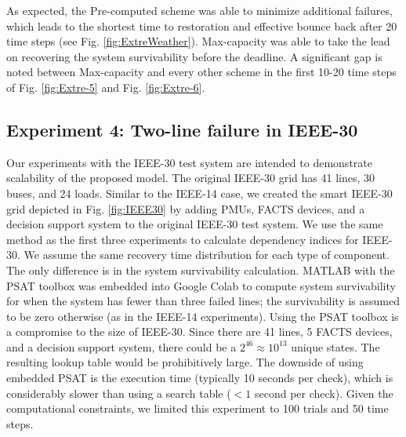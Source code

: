 \documentclass[conference]{IEEEtran}
\begin{document}
As expected, the Pre-computed scheme was able to minimize additional failures, which leads to the shortest time to restoration and effective bounce back after 20 time steps (see Fig.  \ref{fig:ExtreWeather}).  Max-capacity was able to take the lead on recovering the system survivability before the deadline. A significant gap is noted between Max-capacity and every other scheme in the first 10-20 time steps of Fig. \ref{fig:Extre-5} and Fig. \ref{fig:Extre-6}.


\subsection{Experiment 4: Two-line failure in IEEE-30}
Our experiments with the IEEE-30 test system are intended to demonstrate scalability of the proposed model. The original IEEE-30 grid has 41 lines, 30 buses, and 24 loads. Similar to the IEEE-14 case, we created the smart IEEE-30 grid depicted in Fig.  \ref{fig:IEEE30} by adding PMUs, FACTS devices, and a decision support system to the original IEEE-30 test system. 
 We use the same method as the first three experiments to calculate dependency indices for IEEE-30. We assume the same recovery time distribution for each type of component. The only difference is in the system survivability calculation. MATLAB with the PSAT toolbox was embedded into Google Colab to compute system survivability for when the system has fewer than three failed lines; the survivability is assumed to be zero otherwise (as in the IEEE-14 experiments). Using the PSAT toolbox is a compromise to the size of IEEE-30. Since there are 41 lines, 5 FACTS devices, and a decision support system, there could be a $2^{46} \approx 10^{13}$ unique states. The resulting lookup table would be prohibitively large. The downside of using embedded PSAT is the execution time (typically 10 seconds per check), which is considerably slower than using a search table ($< 1$ second per check). 
 Given the computational constraints, we limited this experiment to 100 trials and 50 time steps.%
\end{document}
